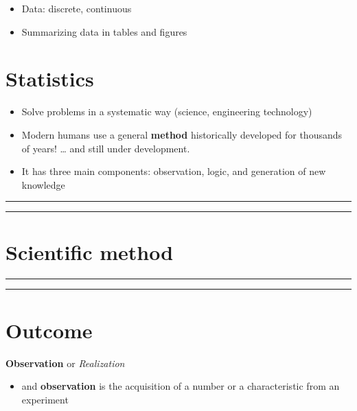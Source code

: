 \documentclass[
]{book}
\providecommand{\tightlist}{%
  \setlength{\itemsep}{0pt}\setlength{\parskip}{0pt}}
\begin{document}
\begin{itemize}
\tightlist
\item
  Data: discrete, continuous
\item
  Summarizing data in tables and figures
\end{itemize}

\hypertarget{statistics}{%
\section{Statistics}\label{statistics}}

\begin{itemize}
\item
  Solve problems in a systematic way (science, engineering technology)
\item
  Modern humans use a general \textbf{method} historically developed for thousands of years! \ldots{} and still under development.
\item
  It has three main components: observation, logic, and generation of new knowledge
\end{itemize}

\begin{center}\rule{0.5\linewidth}{0.5pt}\end{center}

\begin{center}\rule{0.5\linewidth}{0.5pt}\end{center}

\hypertarget{scientific-method}{%
\section{Scientific method}\label{scientific-method}}

\begin{center}\rule{0.5\linewidth}{0.5pt}\end{center}

\begin{center}\rule{0.5\linewidth}{0.5pt}\end{center}

\hypertarget{outcome}{%
\section{Outcome}\label{outcome}}

\textbf{Observation} or \emph{Realization}

\begin{itemize}
\tightlist
\item
  and \textbf{observation} is the acquisition of a number or a characteristic from an experiment
\end{itemize}
\end{document}
